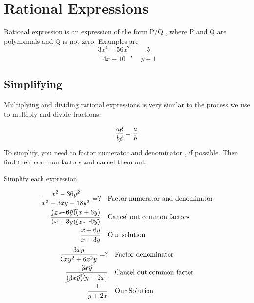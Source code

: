 \chapter{Rational  Expressions}
Rational expression is an expression of the form P/Q   , where P and Q are polynomials and Q is not zero. Examples are 
\begin{equation*}
    		\frac{3x^4-56x^2}{4x-10},\quad \frac{5}{y+1}
\end{equation*}
\section{Simplifying}
Multiplying and dividing rational expressions is very similar to the process we use to multiply and divide fractions.
\begin{tcolorbox}[title=Reduce Common factor,
fonttitle=\bfseries]
        	\begin{equation} 
            	\frac{a\cancel{c}}{b\cancel{c}}=\frac{a}{b} \label{reduce_lcd}
            \end{equation}
\end{tcolorbox}
To simplify, you need to factor numerator and denominator
, if possible. Then find their common factors and cancel them out.
\begin{exa}
	Simplify each expression.
\end{exa}
	\begin{align*}
		\frac{x^2-36y^2}{x^2-3xy-18y^2}=?&	
        						&&\text{Factor numerator and denominator}\\
        \frac{\cancel{(x-6y)}(x+6y)}{(x+3y)\cancel{(x-6y)}}&
        						&&\text{Cancel out common factors}\\
        \frac{x+6y}{x+3y}&		&&\text{Our solution}\\
    \end{align*}
    \begin{align*}
        \frac{3xy}{3xy^2+6x^2y}=?&		&&\text{Factor denominator}\\
        \frac{\cancel{3xy}}{\cancel{(3xy)}(y+2x)}&		&&\text{Cancel out common factor}\\
        \frac{1}{y+2x}&	&&\text{Our Solution}
	\end{align*}
